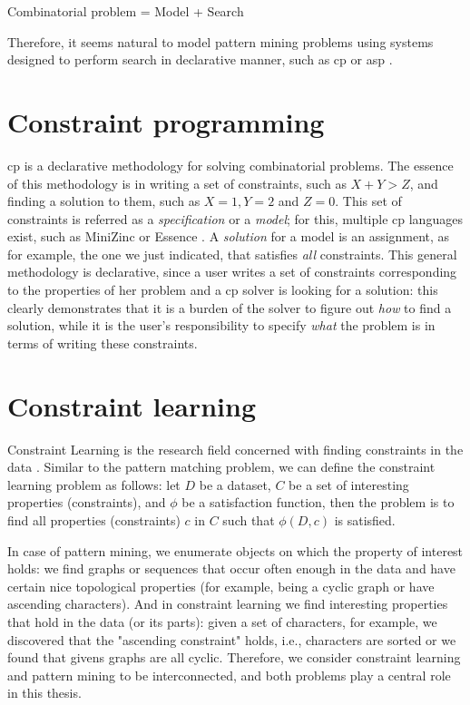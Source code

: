 \begin{center}
  Combinatorial problem = Model + Search
\end{center}

Therefore, it seems natural to model pattern mining problems 
using systems designed to perform search in declarative manner, such
as \acrlong{cp} \parencite{handbookcp} or \acrlong{asp}
\parencite{whatisasp}. %

\section{Constraint programming} 
\acrlong{cp} is a declarative methodology for solving combinatorial
problems. The essence of this methodology is in writing a set of
constraints, such as $X + Y > Z$, and finding a solution to them, such
as $X = 1, Y = 2$ and $Z = 0$. This set of constraints is referred as
a \textit{specification} or a \textit{model}; for this, multiple \acrlong{cp}
languages exist, such as MiniZinc \parencite{minizinc} or Essence
\parencite{essence}. A \textit{solution} for
a model is an assignment, as for example, the one we just indicated, that satisfies
\textit{all} constraints. This general methodology is declarative,
since a user writes a set of constraints corresponding to the
properties of her problem and a \acrshort{cp} solver is looking for a
solution: this clearly demonstrates that it is a burden of the solver
to figure out \textit{how} to find a solution, while it is the user's
responsibility to specify \textit{what} the problem is in terms of
writing these constraints.

\section{Constraint learning}
Constraint Learning is the research field concerned with finding
constraints in the data \parencite{constraint_learning,QUACQ,Conacq}.
Similar to the pattern matching problem, we can define 
the constraint learning problem as follows:
let $D$ be a dataset, $C$ be a set of interesting properties (constraints), and
$\phi$ be a satisfaction function, 
then the problem is to find all properties (constraints) $c$ in $C$ such that $\phi(D,c)$ is satisfied.

In case of pattern mining, we enumerate objects on which the property
of interest holds: we find graphs or sequences that occur often enough
in the data and have certain nice topological properties (for example, being a
cyclic graph or have ascending characters). And in constraint learning we find interesting
properties that hold in the data (or its parts): given a set of
characters, for example, we discovered that the "ascending constraint" holds, i.e.,
characters are sorted or we found that givens graphs are all cyclic.
Therefore, we consider constraint learning and pattern mining to be interconnected, and both problems play a central role in this thesis.


